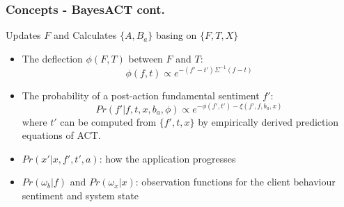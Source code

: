\documentclass{beamer}
\begin{document}
\begin{frame}
\frametitle{Concepts - BayesACT cont.}
Updates $F$ and Calculates $\{A, B_{a}\}$ basing on $\{F, T, X\}$
\begin{itemize}
\pause \item The deflection $\phi(F, T)$ between $F$ and $T$: 
\begin{equation}\label{eq:eq_deflection}
\phi(f,t) \propto e^{-(f'-t')\Sigma^{-1}(f-t)}
\end{equation}
\pause \item The probability of a post-action fundamental sentiment $f'$:
\begin{equation}\label{eq:eq_pr_f}
Pr(f'|f,t,x,b_{a},\phi) \propto e^{-\phi(f',t')-\xi(f',f,b_{a},x)} 
\end{equation}
where $t'$ can be computed from $\{f', t, x\}$ by empirically derived prediction equations of ACT.
\pause \item $Pr(x'|x,f',t',a)$: how the application progresses
\pause \item $Pr(\omega_{b}|f)$ and $Pr(\omega_{x}|x)$: observation functions for the client behaviour sentiment and system state 
\end{itemize}
\end{frame}

\end{document}
